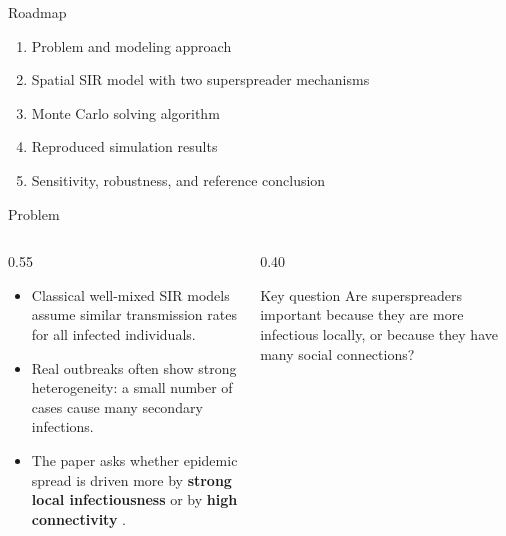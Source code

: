 \documentclass[aspectratio=169,10pt]{beamer}
\newcommand{\keyword}[1]{%
  {\color{Coral}\textbf{#1}}
}
\begin{document}
\begin{frame}{Roadmap}
  \vspace{0.3em}
  \begin{enumerate}
    \item Problem and modeling approach
    \item Spatial SIR model with two superspreader mechanisms
    \item Monte Carlo solving algorithm
    \item Reproduced simulation results
    \item Sensitivity, robustness, and reference conclusion
  \end{enumerate}
  \vspace{1.0em}
  
\end{frame}

\begin{frame}{Problem}
  \begin{columns}[T,totalwidth=\linewidth]
    \begin{column}{0.55\linewidth}
      \begin{itemize}
        \item Classical well-mixed SIR models assume similar transmission rates for all infected individuals.
        \item Real outbreaks often show strong heterogeneity: a small number of cases cause many secondary infections.
        \item The paper asks whether epidemic spread is driven more by \keyword{strong local infectiousness} or by \keyword{high connectivity}.
      \end{itemize}
    \end{column}
    \begin{column}{0.40\linewidth}
      \begin{block}{Key question}
        Are superspreaders important because they are more infectious locally, or because they have many social connections?
      \end{block}
      \vspace{0.45em}
      \centering
    \end{column}
  \end{columns}
\end{frame}
\end{document}
